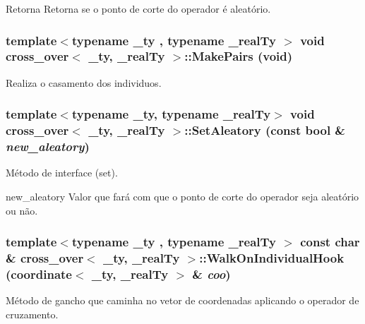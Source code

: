 \begin{DoxyReturn}{Retorna}
Retorna se o ponto de corte do operador é aleatório. 
\end{DoxyReturn}
\hypertarget{classcross__over_a241401bf77d5c8c465991baa90b1d01b}{
\subsubsection[{MakePairs}]{\setlength{\rightskip}{0pt plus 5cm}template$<$typename \_\-ty , typename \_\-realTy $>$ void {\bf cross\_\-over}$<$ \_\-ty, \_\-realTy $>$::MakePairs (void)}}
\label{classcross__over_a241401bf77d5c8c465991baa90b1d01b}
Realiza o casamento dos individuos. \hypertarget{classcross__over_a69f0a44b51940c67f996e9da5cda250b}{
\subsubsection[{SetAleatory}]{\setlength{\rightskip}{0pt plus 5cm}template$<$typename \_\-ty, typename \_\-realTy$>$ void {\bf cross\_\-over}$<$ \_\-ty, \_\-realTy $>$::SetAleatory (const bool \& {\em new\_\-aleatory})}}
\label{classcross__over_a69f0a44b51940c67f996e9da5cda250b}
Método de interface (set).

new\_\-aleatory Valor que fará com que o ponto de corte do operador seja aleatório ou não. \hypertarget{classcross__over_a1febad7c46ec396173e099372d50839e}{
\subsubsection[{WalkOnIndividualHook}]{\setlength{\rightskip}{0pt plus 5cm}template$<$typename \_\-ty , typename \_\-realTy $>$ const char \& {\bf cross\_\-over}$<$ \_\-ty, \_\-realTy $>$::WalkOnIndividualHook ({\bf coordinate}$<$ \_\-ty, \_\-realTy $>$ \& {\em coo})}}
\label{classcross__over_a1febad7c46ec396173e099372d50839e}
Método de gancho que caminha no vetor de coordenadas aplicando o operador de cruzamento.

